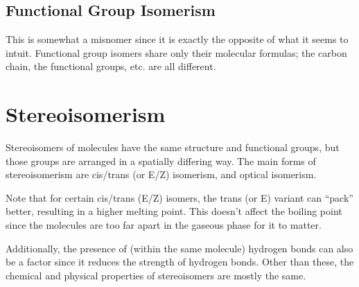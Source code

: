 



		\subsection{Functional Group Isomerism}
			This is somewhat a misnomer since it is exactly the opposite of what it seems to intuit. Functional group isomers
			share only their molecular formulas; the carbon chain, the functional groups, etc. are all different.






	\section{Stereoisomerism}

		Stereoisomers of molecules have the same structure and functional groups, but those groups are arranged in a spatially
		differing way. The main forms of stereoisomerism are cis/trans (or E/Z) isomerism, and optical isomerism.

		Note that for certain cis/trans (E/Z) isomers, the trans (or E) variant can \enquote{pack} better, resulting in a higher melting
		point. This doesn't affect the boiling point since the molecules are too far apart in the gaseous phase for it to matter.

		Additionally, the presence of  (within the same molecule) hydrogen bonds can also be a factor since
		it reduces the strength of  hydrogen bonds. Other than these, the chemical and physical properties of
		stereoisomers are mostly the same.


